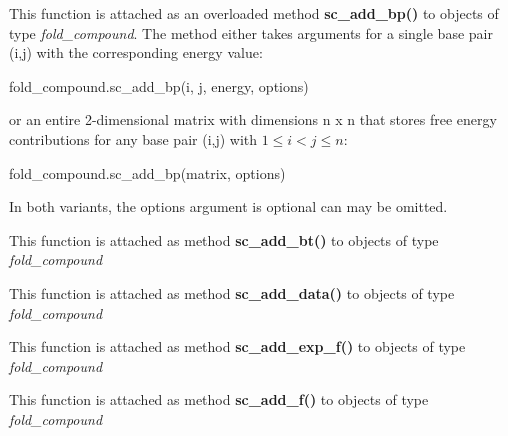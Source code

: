 \begin{DoxyRefList}
This function is attached as an overloaded method {\bfseries sc\+\_\+add\+\_\+bp()} to objects of type {\itshape fold\+\_\+compound}. The method either takes arguments for a single base pair (i,j) with the corresponding energy value\+: 
\begin{DoxyCode}
fold\_compound.sc\_add\_bp(i, j, energy, options)
\end{DoxyCode}
 or an entire 2-\/dimensional matrix with dimensions n x n that stores free energy contributions for any base pair (i,j) with $ 1 \leq i < j \leq n $\+: 
\begin{DoxyCode}
fold\_compound.sc\_add\_bp(matrix, options)
\end{DoxyCode}
 In both variants, the {\ttfamily options} argument is optional can may be omitted.  
\item[\label{wrappers__wrappers000023}%
\Hypertarget{wrappers__wrappers000023}%
Global \mbox{\hyperlink{group__soft__constraints_gabde7d07a79bb9a8f4721aee247b674ea}{vrna\+\_\+sc\+\_\+add\+\_\+bt}} (vrna\+\_\+fold\+\_\+compound\+\_\+t $\ast$vc, vrna\+\_\+callback\+\_\+sc\+\_\+backtrack $\ast$f)]This function is attached as method {\bfseries sc\+\_\+add\+\_\+bt()} to objects of type {\itshape fold\+\_\+compound}  
\item[\label{wrappers__wrappers000021}%
\Hypertarget{wrappers__wrappers000021}%
Global \mbox{\hyperlink{group__soft__constraints_ga15c6d52471ec97897e2bb7f964f5deb6}{vrna\+\_\+sc\+\_\+add\+\_\+data}} (vrna\+\_\+fold\+\_\+compound\+\_\+t $\ast$vc, void $\ast$data, vrna\+\_\+callback\+\_\+free\+\_\+auxdata $\ast$free\+\_\+data)]This function is attached as method {\bfseries sc\+\_\+add\+\_\+data()} to objects of type {\itshape fold\+\_\+compound}  
\item[\label{wrappers__wrappers000024}%
\Hypertarget{wrappers__wrappers000024}%
Global \mbox{\hyperlink{group__soft__constraints_ga87e382b5d0c9b7d9ce1b79c0473ff700}{vrna\+\_\+sc\+\_\+add\+\_\+exp\+\_\+f}} (vrna\+\_\+fold\+\_\+compound\+\_\+t $\ast$vc, vrna\+\_\+callback\+\_\+sc\+\_\+exp\+\_\+energy $\ast$exp\+\_\+f)]This function is attached as method {\bfseries sc\+\_\+add\+\_\+exp\+\_\+f()} to objects of type {\itshape fold\+\_\+compound}  
\item[\label{wrappers__wrappers000022}%
\Hypertarget{wrappers__wrappers000022}%
Global \mbox{\hyperlink{group__soft__constraints_ga8c7d907ec0125cd61c04e0908010a4e9}{vrna\+\_\+sc\+\_\+add\+\_\+f}} (vrna\+\_\+fold\+\_\+compound\+\_\+t $\ast$vc, vrna\+\_\+callback\+\_\+sc\+\_\+energy $\ast$f)]This function is attached as method {\bfseries sc\+\_\+add\+\_\+f()} to objects of type {\itshape fold\+\_\+compound}  

\end{DoxyRefList}
